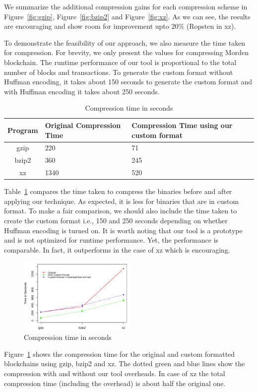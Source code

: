 We summarize the additional compression gains for each compression scheme in Figure~\ref{fig:gzip}, Figure~\ref{fig:bzip2} and Figure~\ref{fig:xz}. 
As we can see, the results are encouraging and show room for improvement upto $20\%$ (Ropsten in xz).

To demonstrate the feasibility of our approach, we also measure the time taken for compression. 
For brevity, we only present the values for compressing Morden blockchain.
The runtime performance of our tool is proportional to the total number of blocks and transactions. 
To generate the custom format without Huffman encoding, it takes about 150 seconds to generate the custom format and with Huffman encoding it takes about 250 seconds. 



\begin{table}[H]
	\centering
	\begin{tabular}{c | p{} | p{1.5cm}} 
	Program & {Original Compression Time} & {Compression Time using our custom format} \\
	\hline
	gzip & 220  & 71 \\
	bzip2 & 360  & 245\\
	xz & 1340 & 520 \\
	\end{tabular}
	\caption{Compression time in seconds}
	\label{tab:comptime}
\end{table}
Table~\ref{tab:comptime} compares the time taken to compress the binaries before and after applying our technique. As expected, it is less for binaries that are in custom format. 
To make a fair comparison, we should also include the time taken to create the custom format i.e., 150 and 250 seconds depending on whether Huffman encoding is turned on.
It is worth noting that our tool is a prototype and is not optimized for runtime performance. 
Yet, the performance is comparable. 
In fact, it outperforms in the case of xz which is encouraging.
\begin{figure}[H]
	\centering
	\includegraphics[width=0.5\textwidth, scale=0.5]{plots/time}
	\caption{Compression time in seconds}
	\label{fig:comptime}
\end{figure}
Figure~\ref{fig:comptime} shows the compression time for the original and custom formatted blockchains using gzip, bzip2 and xz.
The dotted green and blue lines show the compression with and without our tool
overheads. In case of xz the total compression time (including the overhead) is about half the original one.

